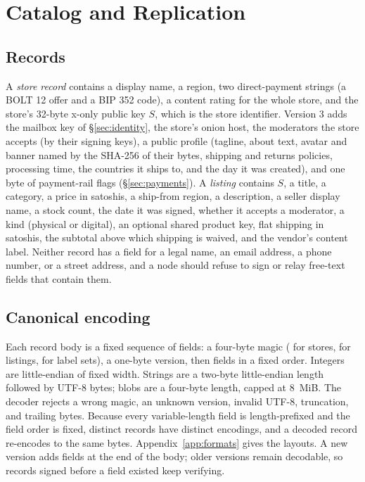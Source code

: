 \section{Catalog and Replication}
\label{sec:catalog}

\subsection{Records}

A \emph{store record} contains a display name, a region, two direct-payment strings (a BOLT 12 offer and a BIP 352 code), a content rating for the whole store, and the store's 32-byte x-only public key $S$, which is the store identifier. Version 3 adds the mailbox key of \S\ref{sec:identity}, the store's onion host, the moderators the store accepts (by their signing keys), a public profile (tagline, about text, avatar and banner named by the SHA-256 of their bytes, shipping and returns policies, processing time, the countries it ships to, and the day it was created), and one byte of payment-rail flags (\S\ref{sec:payments}). A \emph{listing} contains $S$, a title, a category, a price in satoshis, a ship-from region, a description, a seller display name, a stock count, the date it was signed, whether it accepts a moderator, a kind (physical or digital), an optional shared product key, flat shipping in satoshis, the subtotal above which shipping is waived, and the vendor's content label. Neither record has a field for a legal name, an email address, a phone number, or a street address, and a node should refuse to sign or relay free-text fields that contain them.

\subsection{Canonical encoding}

Each record body is a fixed sequence of fields: a four-byte magic ( for stores,  for listings,  for label sets), a one-byte version, then fields in a fixed order. Integers are little-endian of fixed width. Strings are a two-byte little-endian length followed by UTF-8 bytes; blobs are a four-byte length, capped at 8~MiB. The decoder rejects a wrong magic, an unknown version, invalid UTF-8, truncation, and trailing bytes. Because every variable-length field is length-prefixed and the field order is fixed, distinct records have distinct encodings, and a decoded record re-encodes to the same bytes. Appendix~\ref{app:formats} gives the layouts. A new version adds fields at the end of the body; older versions remain decodable, so records signed before a field existed keep verifying.

